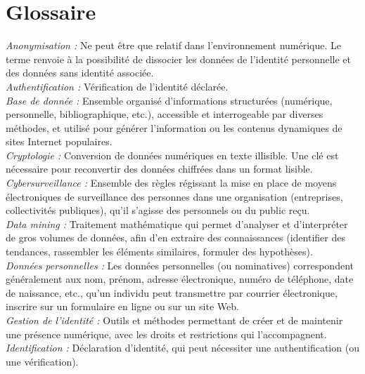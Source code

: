 \documentclass[a4paper,12pt]{article}
\begin{document}
\section*{Glossaire}

\emph{Anonymisation :} Ne peut être que relatif dans l’environnement numérique. Le terme renvoie à la possibilité de dissocier les données de l’identité personnelle et des données sans identité associée. \\


\emph{Authentification :} Vérification de l’identité déclarée.\\


\emph{Base de donnée :} Ensemble organisé d’informations structurées (numérique, personnelle, bibliographique, etc.), accessible et interrogeable par diverses méthodes, et utilisé pour générer l’information ou les contenus dynamiques de sites Internet populaires.\\

\emph{Cryptologie :} Conversion de données numériques en texte illisible. Une clé est nécessaire pour reconvertir des données chiffrées dans un format lisible.\\


\emph{Cybersurveillance :} Ensemble des règles régissant la mise en place de moyens électroniques de surveillance des personnes dans une organisation (entreprises, collectivités publiques), qu’il s’agisse des personnels ou du public reçu. \\


\emph{Data mining :} Traitement mathématique qui permet d’analyser et d’interpréter de gros volumes de données, afin d’en extraire des connaissances (identifier des tendances, rassembler les éléments similaires, formuler des hypothèses). \\


\emph{Données personnelles :} Les données personnelles (ou nominatives) correspondent généralement aux nom, prénom, adresse électronique, numéro de téléphone, date de naissance, etc., qu’un individu peut transmettre par courrier électronique, inscrire sur un formulaire en ligne ou sur un site Web.\\


\emph{Gestion de l’identité :} Outils et méthodes permettant de créer et de maintenir une présence numérique, avec les droits et restrictions qui l’accompagnent. \\


\emph{Identification :} Déclaration d’identité, qui peut nécessiter une authentification (ou une vérification). \\
\end{document}

